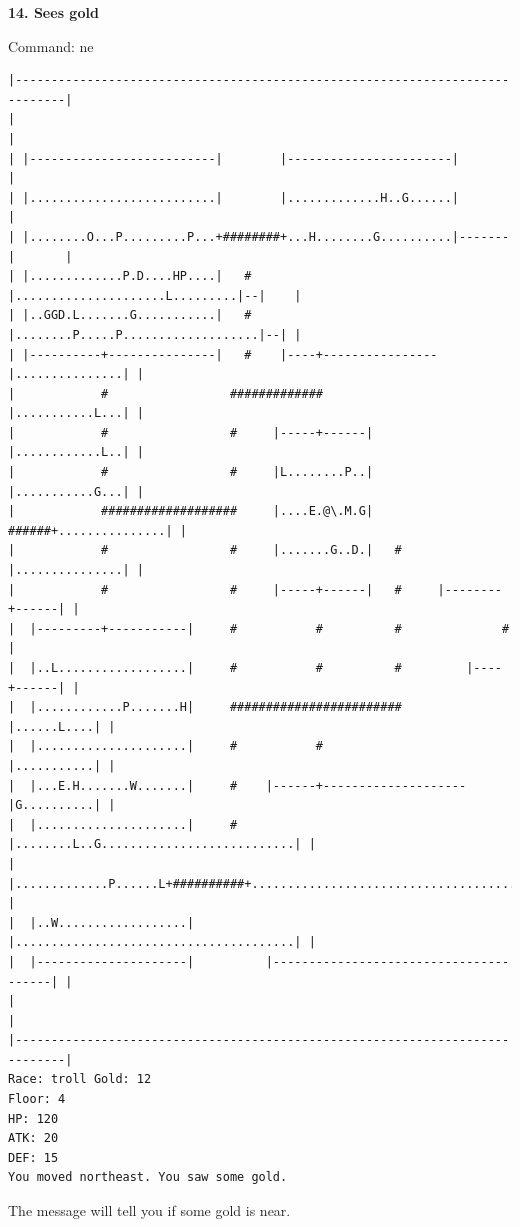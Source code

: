 \documentclass[11pt]{article}
\theoremstyle{plain}
\begin{document}
\newpage
\textbf{14. Sees gold}

Command: ne
\begin{Verbatim}[fontsize=\scriptsize]
|-----------------------------------------------------------------------------|
|                                                                             |
| |--------------------------|        |-----------------------|               |
| |..........................|        |.............H..G......|               |
| |........O...P.........P...+########+...H........G..........|-------|       |
| |.............P.D....HP....|   #    |.....................L.........|--|    |
| |..GGD.L.......G...........|   #    |........P.....P...................|--| |
| |----------+---------------|   #    |----+----------------|...............| |
|            #                 #############                |...........L...| |
|            #                 #     |-----+------|         |............L..| |
|            #                 #     |L........P..|         |...........G...| |
|            ###################     |....E.@\.M.G|   ######+...............| |
|            #                 #     |.......G..D.|   #     |...............| |
|            #                 #     |-----+------|   #     |--------+------| |
|  |---------+-----------|     #           #          #              #        |
|  |..L..................|     #           #          #         |----+------| |
|  |............P.......H|     ########################         |......L....| |
|  |.....................|     #           #                    |...........| |
|  |...E.H.......W.......|     #    |------+--------------------|G..........| |
|  |.....................|     #    |........L..G...........................| |
|  |.............P......L+##########+.......................................| |
|  |..W..................|          |.......................................| |
|  |---------------------|          |---------------------------------------| |
|                                                                             |
|-----------------------------------------------------------------------------|
Race: troll Gold: 12                                                   Floor: 4
HP: 120
ATK: 20
DEF: 15
You moved northeast. You saw some gold. 
\end{Verbatim}

The message will tell you if some gold is near.
\end{document}
